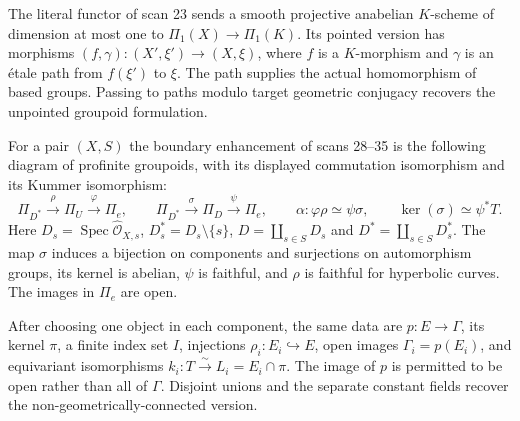 \begin{proposition}
\label{A:typed-functor}
The literal functor of scan 23 sends a smooth projective anabelian
$K$-scheme of dimension at most one to
$\Pi_1(X)\longrightarrow\Pi_1(K)$.  Its pointed version has morphisms
$(f,\gamma):(X',\xi')\to(X,\xi)$, where $f$ is a $K$-morphism and
$\gamma$ is an \'etale path from $f(\xi')$ to $\xi$.  The path supplies
the actual homomorphism of based groups.  Passing to paths modulo target
geometric conjugacy recovers the unpointed groupoid formulation.

For a pair $(X,S)$ the boundary enhancement of scans 28--35 is the
following diagram of profinite groupoids, with its displayed
commutation isomorphism and its Kummer isomorphism:
\[
 \Pi_{D^*}\xrightarrow{\rho}\Pi_U\xrightarrow{\varphi}\Pi_e,
 \qquad
 \Pi_{D^*}\xrightarrow{\sigma}\Pi_D\xrightarrow{\psi}\Pi_e,
 \qquad \alpha:\varphi\rho\simeq\psi\sigma,
 \qquad \ker(\sigma)\simeq\psi^*T .
\]
Here $D_s=\operatorname{Spec}\widehat{\mathcal O}_{X,s}$,
$D_s^*=D_s\setminus\{s\}$, $D=\coprod_{s\in S}D_s$ and
$D^*=\coprod_{s\in S}D_s^*$.  The map $\sigma$ induces a bijection
on components and surjections on automorphism groups, its kernel is
abelian, $\psi$ is faithful, and $\rho$ is faithful for hyperbolic
curves.  The images in $\Pi_e$ are open.

After choosing one object in each component, the same data are
$p:E\to\Gamma$, its kernel $\pi$, a finite index set $I$, injections
$\rho_i:E_i\hookrightarrow E$, open images
$\Gamma_i=p(E_i)$, and equivariant isomorphisms
$k_i:T\xrightarrow{\sim}L_i=E_i\cap\pi$.
The image of $p$ is permitted to be open rather than all of $\Gamma$.
Disjoint unions and the separate constant fields recover the
non-geometrically-connected version.
\end{proposition}
